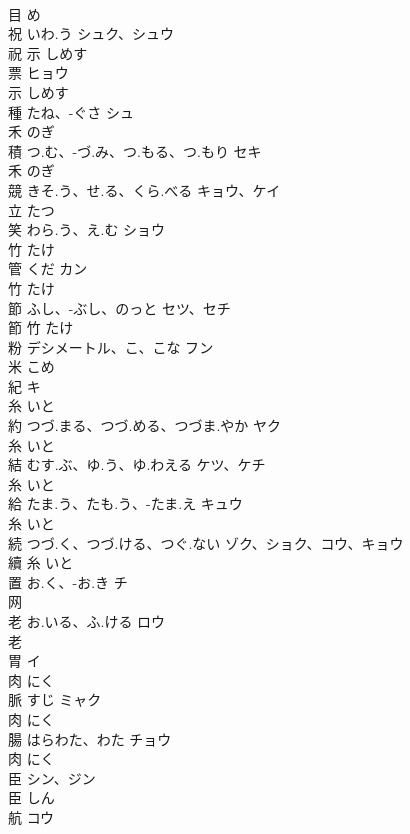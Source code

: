 \documentclass[8pt]{extreport}
\begin{document}
\begin{CJK}{UTF8}{min}
\\	目		め		
\\	祝	いわ.う	シュク、シュウ	
\\	祝	示		しめす		
\\	票		ヒョウ	
\\	示		しめす		
\\	種	たね、-ぐさ	シュ	
\\	禾		のぎ		
\\	積	つ.む、-づ.み、つ.もる、つ.もり	セキ	
\\	禾		のぎ		
\\	競	きそ.う、せ.る、くら.べる	キョウ、ケイ	
\\	立		たつ		
\\	笑	わら.う、え.む	ショウ	
\\	竹		たけ		
\\	管	くだ	カン	
\\	竹		たけ		
\\	節	ふし、-ぶし、のっと	セツ、セチ	
\\	節	竹		たけ		
\\	粉	デシメートル、こ、こな	フン	
\\	米		こめ		
\\	紀		キ	
\\	糸		いと		
\\	約	つづ.まる、つづ.める、つづま.やか	ヤク	
\\	糸		いと		
\\	結	むす.ぶ、ゆ.う、ゆ.わえる	ケツ、ケチ	
\\	糸		いと		
\\	給	たま.う、たも.う、-たま.え	キュウ	
\\	糸		いと		
\\	続	つづ.く、つづ.ける、つぐ.ない	ゾク、ショク、コウ、キョウ	
\\	續	糸		いと		
\\	置	お.く、-お.き	チ	
\\	网				
\\	老	お.いる、ふ.ける	ロウ	
\\	老				
\\	胃		イ	
\\	肉		にく		
\\	脈	すじ	ミャク	
\\	肉		にく		
\\	腸	はらわた、わた	チョウ	
\\	肉		にく		
\\	臣		シン、ジン	
\\	臣		しん		
\\	航		コウ	

\end{CJK}
\end{document}
